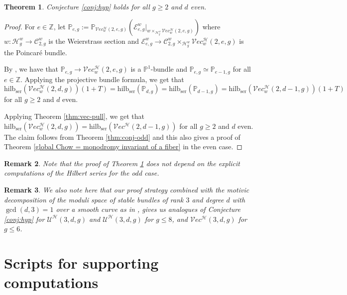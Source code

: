 \documentclass[11pt]{amsart}
\newcommand\Z{\mathbb{Z}}
\newtheorem{theorem}{Theorem}[section]
\newtheorem{rem}[theorem]{Remark}
\theoremstyle{definition}
\newcommand{\hilb}{\mathrm{hilb}_{\mathrm{ser}}}
\newcommand{\p}{\mathbb{P}}
\newcommand{\ri}{\rightarrow}
\newcommand{\h}{\mathcal{H}}
\newcommand{\ve}{\mathcal{V}ec}
\newcommand{\e}{\mathcal{E}}
\newcommand{\mC}{\mathcal{C}}
\begin{document}
\begin{theorem}\label{thm:conj-even}
    Conjecture \ref{conj:hyp} holds for all $g\geq 2$ and $d$ even.
\end{theorem}
\begin{proof}
For $e\in\Z$, let $\p_{e,g}:= \p_{\ve_w^\h(2,e,g)}(\e^w_{e,g}|_{w\times_{\h_g^w}\ve_w^\h(2,e,g)})$ where $w:\h_g^w\ri\mC_{2,g}^w$ is the Weierstrass section and $\e^w_{e,g}\ri \mC_{2,g}^w\times_{\h_g^w}\ve^\h_w(2,e,g)$ is the Poincar\'e bundle.

By \cite[Theorem 4.2]{shubham-r2-ss}, we have that $\p_{e,g}\ri \ve_w^\h(2,e,g)$ is a $\p^1$-bundle and $\p_{e,g}\simeq \p_{e-1,g}$ for all $e\in\Z$.
Applying the projective bundle formula, we get that 
$$\hilb (\ve_w^\h(2,d,g))(1+T) = \hilb(\p_{d,g}) = \hilb(\p_{d-1,g}) = \hilb(\ve^\h_w(2,d-1,g))(1+T)$$ for all $g\geq 2$ and $d$ even.

\noindent Applying Theorem \ref{thm:vec-pull}, we get that $\hilb (\ve_w^\h(2,d,g)) = \hilb(\ve^\h(2,d-1,g))$ for all $g\geq 2$ and $d$ even.
The claim follows from Theorem \ref{thm:conj-odd} and this also gives a proof of Theorem \ref{global Chow = monodromy invariant of a fiber} in the even case.
\end{proof}
\begin{rem}
   Note that the proof of Theorem \ref{thm:conj-even} does not depend on the explicit computations of the Hilbert series for the odd case.
\end{rem}
\begin{rem}
    We also note here that our proof strategy combined with the motivic decomposition of the moduli space of stable bundles of rank $3$ and degree $d$ with $\gcd (d,3)=1$ over a smooth curve as in \cite{MR4399901}, gives us analogues of Conjecture \ref{conj:hyp} for $\mathcal U^\mathcal H(3,d,g)$ and $\mathscr U^\mathcal H(3,d,g)$ for $g\leq 8$, and $\mathcal Vec^\mathcal H(3,d,g)$ for $g\leq 6$. 
\end{rem}
\appendix
\vspace{-0.1in}
\section{Scripts for supporting computations}
\end{document}
